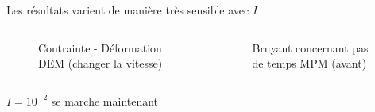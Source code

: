 \documentclass[10pt]{beamer}
\begin{document}
\begin{frame}{Les résultats varient de manière très sensible avec $I$}
    \begin{columns}
        \begin{column}{0.5\textwidth}
            \begin{figure}[h]
                \centering
                \scalebox{0.5}{}
                \caption{Contrainte - Déformation DEM (changer la vitesse)}
            \end{figure}
        \end{column}
        \begin{column}{0.5\textwidth}
            \begin{figure}[h]
                \centering
                \scalebox{0.5}{}
                \caption{Bruyant concernant pas de temps MPM (avant)}
            \end{figure}
        \end{column}
    \end{columns}
    $I = 10^{-2}$ se marche maintenant
\end{frame}
\end{document}
